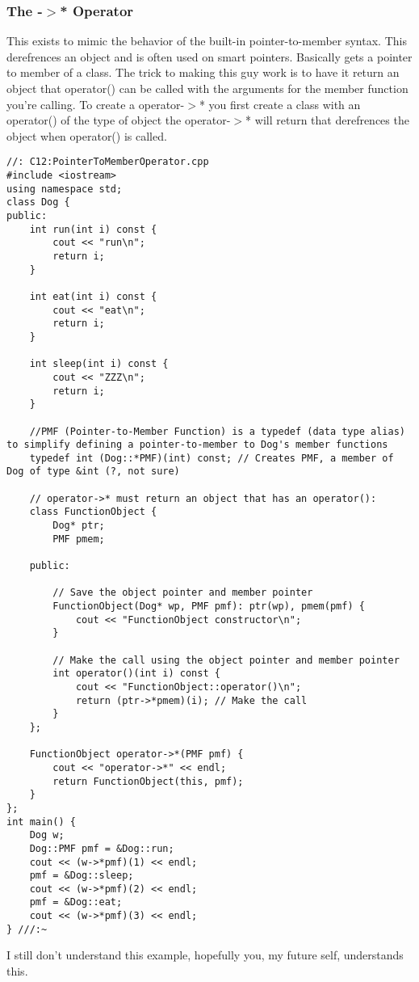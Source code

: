 \documentclass[12pt]{article}
\begin{document}
\subsubsection*{The -$>$* Operator}
This exists to mimic the behavior of the built-in pointer-to-member syntax. This derefrences an object and is often used on smart pointers. Basically gets a pointer to member of a class. The trick to making this guy work is to have it return an object that operator() can be called with the arguments for the member function you're calling. To create a operator-$>$* you first create a class with an operator() of the type of object the operator-$>$* will return that derefrences the object when operator() is called.
\begin{lstlisting}
//: C12:PointerToMemberOperator.cpp
#include <iostream>
using namespace std;
class Dog {
public:
    int run(int i) const {
        cout << "run\n";
        return i;
    }

    int eat(int i) const {
        cout << "eat\n";
        return i;
    }

    int sleep(int i) const {
        cout << "ZZZ\n";
        return i;
    }

    //PMF (Pointer-to-Member Function) is a typedef (data type alias) to simplify defining a pointer-to-member to Dog's member functions
    typedef int (Dog::*PMF)(int) const; // Creates PMF, a member of Dog of type &int (?, not sure)

    // operator->* must return an object that has an operator():
    class FunctionObject {
        Dog* ptr;
        PMF pmem;

    public:

        // Save the object pointer and member pointer
        FunctionObject(Dog* wp, PMF pmf): ptr(wp), pmem(pmf) {
            cout << "FunctionObject constructor\n";
        }

        // Make the call using the object pointer and member pointer
        int operator()(int i) const {
            cout << "FunctionObject::operator()\n";
            return (ptr->*pmem)(i); // Make the call
        }
    };

    FunctionObject operator->*(PMF pmf) {
        cout << "operator->*" << endl;
        return FunctionObject(this, pmf);
    }
};
int main() {
    Dog w;
    Dog::PMF pmf = &Dog::run;
    cout << (w->*pmf)(1) << endl;
    pmf = &Dog::sleep;
    cout << (w->*pmf)(2) << endl;
    pmf = &Dog::eat;
    cout << (w->*pmf)(3) << endl;
} ///:~
\end{lstlisting}
I still don't understand this example, hopefully you, my future self, understands this.
\end{document}
